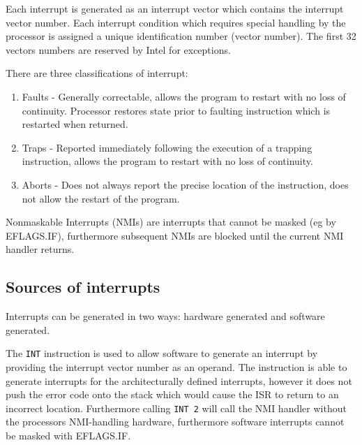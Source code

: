 \documentclass{article}
\newcommand{\layout}[1]{\parbox{\linewidth}{#1}}
\begin{document}
\layout{
  Each interrupt is generated as an interrupt vector which contains the interrupt vector number.
  Each interrupt condition which requires special handling by the processor is assigned a unique identification number (vector number).
  The first 32 vectors numbers are reserved by Intel for exceptions.

  \bigskip \cite[Chapter~7.2]{sdm3}
} \bigskip

\layout {
  There are three classifications of interrupt:
  \begin{enumerate}
    \item Faults - Generally correctable, allows the program to restart with no loss of continuity.
      Processor restores state prior to faulting instruction which is restarted when returned.
    \item Traps - Reported immediately following the execution of a trapping instruction, allows the program to restart with no loss of continuity.
    \item Aborts - Does not always report the precise location of the instruction, does not allow the restart of the program.
  \end{enumerate}

  \cite[Chapter~7.5]{sdm3}
} \bigskip

\layout{
  Nonmaskable Interrupts (NMIs) are interrupts that cannot be masked (eg by EFLAGS.IF), furthermore subsequent NMIs are blocked until the current NMI handler returns.

  \bigskip \cite[Chapter~7.7]{sdm3}
}

\layout{
  \subsection{Sources of interrupts}

  Interrupts can be generated in two ways: hardware generated and software generated.

  \bigskip \cite[Chapter~7.3]{sdm3}
} \bigskip

\layout{
  The \texttt{INT} instruction is used to allow software to generate an interrupt by providing the interrupt vector number as an operand.
  The instruction is able to generate interrupts for the architecturally defined interrupts, however it does not push the error code onto the stack which would cause the ISR to return to an incorrect location.
  Furthermore calling \texttt{INT 2} will call the NMI handler without the processors NMI-handling hardware, furthermore software interrupts cannot be masked with EFLAGS.IF.

  \bigskip \cite[Chapter~7.3.3]{sdm3} \cite[Chapter~7.4.2]{sdm3}
} \bigskip
\end{document}
